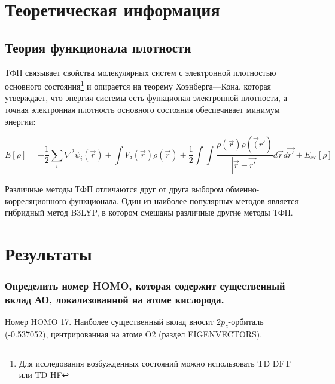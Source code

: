 \newpage
\section{Теоретическая информация}
\subsection{Теория функционала плотности}
ТФП связывает свойства молекулярных систем с электронной плотностью основного состояния\footnote{Для исследования возбужденных состояний можно использовать TD DFT или TD HF} и опирается на теорему Хоэнберга—Кона, которая утверждает, что энергия системы есть функционал электронной плотности, а точная электронная плотность основного состояния обеспечивает минимум энергии:

\begin{equation}
    E[\rho] = -\frac{1}{2}\sum\limits_i\nabla^2\psi_i(\Vec{r}) + \int V_{я}(\Vec{r})\rho(\Vec{r}) + \frac{1}{2}\int\int\frac{\rho(\Vec{r})\rho(\Vec(r')}{|\Vec{r} - \Vec{r'}|}d\Vec{r}d\Vec{r'} + E_{xc}[\rho]
\end{equation}

Различные методы ТФП отличаются друг от друга выбором обменно-корреляционного функционала. Один из наиболее популярных методов является гибридный метод B3LYP, в котором смешаны различные другие методы ТФП. 

\newpage
\section{Результаты}
\subsubsection*{Определить номер HOMO, которая содержит существенный вклад АО, локализованной на атоме кислорода.}
Номер HOMO 17. Наиболее существенный вклад вносит $2p_z$-орбиталь (-0.537052), центрированная на атоме O2 (раздел EIGENVECTORS).
